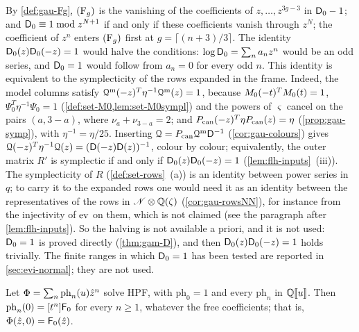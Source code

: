 \begin{rmk}
\label{rmk:con-genus}
By \cref{def:gau-Fg}, $(\mathrm{F}_{g})$ is the vanishing of the coefficients of $z,\dots,z^{3g-3}$ in $\mathsf{D}_0-1$; and $\mathsf{D}_0\equiv 1\bmod z^{N+1}$ if and only if these coefficients vanish through $z^N$; the coefficient of $z^n$ enters $(\mathrm{F}_{g})$ first at $g=\lceil(n+3)/3\rceil$. The identity $\mathsf{D}_0(z)\mathsf{D}_0(-z)=1$ would halve the conditions: $\log\mathsf{D}_0=\sum_na_nz^n$ would be an odd series, and $\mathsf{D}_0=1$ would follow from $a_n=0$ for every odd $n$. This identity is equivalent to the symplecticity of the rows expanded in the frame. Indeed, the model columns satisfy $\mathcal{Q}^{\mathrm m}(-z)^T\eta^{-1}\mathcal{Q}^{\mathrm m}(z)=1$, because $M_{0}(-t)^TM_{0}(t)=1$, $\Psi_0^T\eta^{-1}\Psi_0=1$ (\cref{def:set-M0,lem:set-M0sympl}) and the powers of $\varsigma$ cancel on the pairs $(a,3-a)$, where $\nu_a+\nu_{3-a}=2$; and $P_{\mathrm{can}}(-z)^T\eta P_{\mathrm{can}}(z)=\eta$ (\cref{prop:gau-symp}), with $\eta^{-1}=\eta/25$. Inserting $\mathcal{Q}=P_{\mathrm{can}}\mathcal{Q}^{\mathrm m}\mathsf{D}^{-1}$ (\cref{cor:gau-colours}) gives $\mathcal{Q}(-z)^T\eta^{-1}\mathcal{Q}(z)=(\mathsf{D}(-z)\mathsf{D}(z))^{-1}$, colour by colour; equivalently, the outer matrix $R'$ is symplectic if and only if $\mathsf{D}_0(z)\mathsf{D}_0(-z)=1$ (\cref{lem:flh-inputs}~(iii)). The symplecticity of $R$ (\cref{def:set-rows}~(a)) is an identity between power series in $q$; to carry it to the expanded rows one would need it as an identity between the representatives of the rows in $\mathscr{N}\otimes\mathbb{Q}(\zeta)$ (\cref{cor:gau-rowsNN}), for instance from the injectivity of $\operatorname{ev}$ on them, which is not claimed (see the paragraph after \cref{lem:flh-inputs}). So the halving is not available a priori, and it is not used: $\mathsf{D}_0=1$ is proved directly (\cref{thm:gam-D}), and then $\mathsf{D}_0(z)\mathsf{D}_0(-z)=1$ holds trivially. The finite ranges in which $\mathsf{D}_0=1$ has been tested are reported in \cref{sec:evi-normal}; they are not used.
\end{rmk}

\begin{lem}
\label{lem:con-u0}
Let $\Phi=\sum_n\mathrm{ph}_n(u)\hat{z}^n$ solve HPF, with $\mathrm{ph}_0=1$ and every $\mathrm{ph}_n$ in $\mathbb{Q}[\![ u ]\!]$. Then $\mathrm{ph}_n(0)=[t^n]\mathsf{F}_0$ for every $n\geq 1$, whatever the free coefficients; that is, $\Phi(\hat{z},0)=\mathsf{F}_0(\hat{z})$.
\end{lem}

